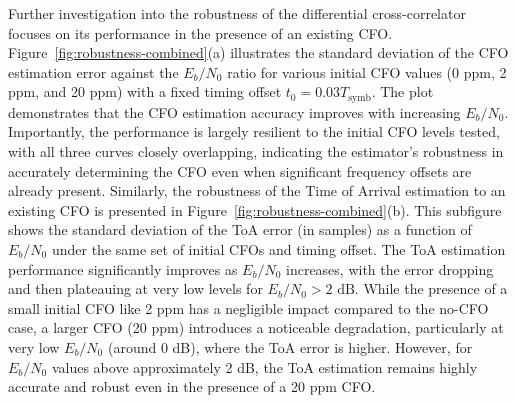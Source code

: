 \documentclass[11pt]{article}
\begin{document}
	Further investigation into the robustness of the differential cross-correlator focuses on its performance in the presence of an existing CFO. Figure~\ref{fig:robustness-combined}(a) illustrates the standard deviation of the CFO estimation error against the $E_b/N_0$ ratio for various initial CFO values (0 ppm, 2 ppm, and 20 ppm) with a fixed timing offset $t_0 = 0.03T_{\text{symb}}$. The plot demonstrates that the CFO estimation accuracy improves with increasing $E_b/N_0$. Importantly, the performance is largely resilient to the initial CFO levels tested, with all three curves closely overlapping, indicating the estimator's robustness in accurately determining the CFO even when significant frequency offsets are already present.
	Similarly, the robustness of the Time of Arrival estimation to an existing CFO is presented in Figure~\ref{fig:robustness-combined}(b). This subfigure shows the standard deviation of the ToA error (in samples) as a function of $E_b/N_0$ under the same set of initial CFOs and timing offset. The ToA estimation performance significantly improves as $E_b/N_0$ increases, with the error dropping and then plateauing at very low levels for $E_b/N_0 > 2 \text{ dB}$. While the presence of a small initial CFO like 2 ppm has a negligible impact compared to the no-CFO case, a larger CFO (20 ppm) introduces a noticeable degradation, particularly at very low $E_b/N_0$ (around 0 dB), where the ToA error is higher. However, for $E_b/N_0$ values above approximately 2 dB, the ToA estimation remains highly accurate and robust even in the presence of a 20 ppm CFO.
\end{document}
